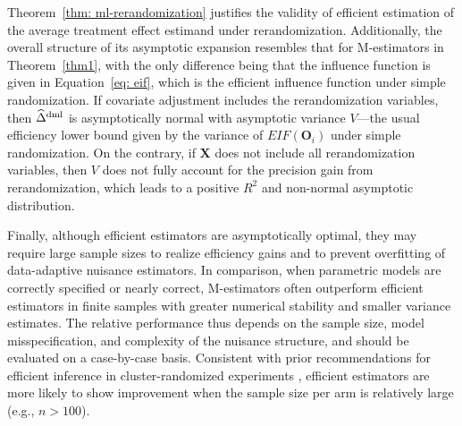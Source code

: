 \documentclass[12pt]{article}
\newcommand{\bX}{\boldsymbol{X}}\newcommand{\bO}{\boldsymbol{O}}
\begin{document}
{Theorem~\ref{thm: ml-rerandomization} justifies the validity of efficient estimation of the average treatment effect estimand under rerandomization. Additionally, the overall structure of its asymptotic expansion resembles that for M-estimators in Theorem~\ref{thm1}, with the only difference being that the influence function is given in Equation~\eqref{eq: eif}, which is the efficient influence function under simple randomization. If covariate adjustment includes the rerandomization variables, then $\widehat{\Delta}^{\textup{dml}}$ is asymptotically normal with asymptotic variance $V$---the usual efficiency lower bound given by the variance of $EIF(\bO_i)$ under simple randomization. On the contrary, if $\bX$ does not include all rerandomization variables, then  $V$ does not fully account for the precision gain from rerandomization, which leads to a positive $R^2$ and non-normal asymptotic distribution.




{Finally, although efficient estimators are asymptotically optimal, they may require large sample sizes to realize efficiency gains and to prevent overfitting of data-adaptive nuisance estimators. In comparison, when parametric models are correctly specified or nearly correct, M-estimators often outperform efficient estimators in finite samples with greater numerical stability and smaller variance estimates. The relative performance thus depends on the sample size, model misspecification, and complexity of the nuisance structure, and should be evaluated on a case-by-case basis. Consistent with prior recommendations for efficient inference in cluster-randomized experiments \citep{wang2023CRT}, efficient estimators are more likely to show improvement when the sample size per arm is relatively large (e.g., $n>100$).}

}
\end{document}
